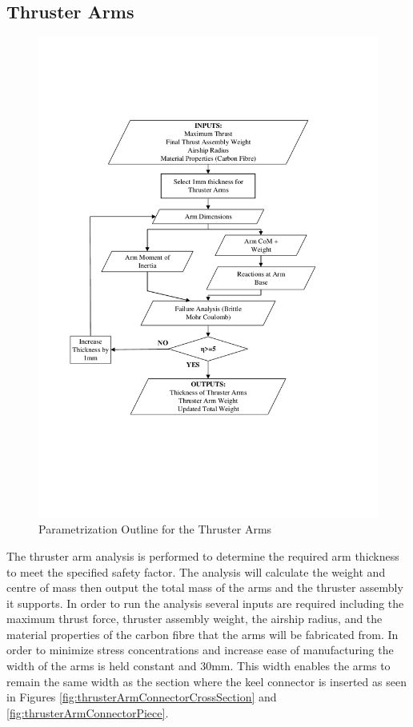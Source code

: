 \documentclass[../main.tex]{subfiles}
\begin{document}
\subsection{Thruster Arms} \label{thrustArms}

\begin{figure}[H]
	\centering
	\includegraphics[width=.9\linewidth]{img/paramaterization/thrusterArms.pdf}
	\caption{Parametrization Outline for the Thruster Arms}
	\label{fig:thrusterArmsParametrization}
\end{figure}

The thruster arm analysis is performed to determine the required arm thickness to meet the specified safety factor. The analysis will calculate the weight and centre of mass then output the total mass of the arms and the thruster assembly it supports. In order to run the analysis several inputs are required including the maximum thrust force, thruster assembly weight, the airship radius, and the material properties of the carbon fibre that the arms will be fabricated from. In order to minimize stress concentrations and increase ease of manufacturing the width of the arms is held constant and 30mm. This width enables the arms to remain the same width as the section where the keel connector is inserted as seen in Figures \ref{fig:thrusterArmConnectorCrossSection} and \ref{fig:thrusterArmConnectorPiece}. \\
\end{document}
